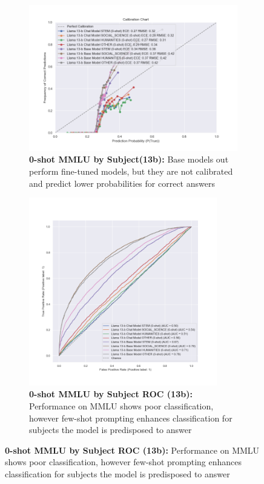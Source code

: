 \documentclass[11pt]{article}
\begin{document}
\begin{figure}
     \centering
     \begin{subfigure}[b]{0.60\textwidth}
         \centering \includegraphics[width=1.1\textwidth]{figures/0-shot-MMLU-subjects-13b.png}
         \caption{\textbf{0-shot MMLU by Subject(13b):}  Base models out perform fine-tuned models, but they are not calibrated and predict lower probabilities for correct answers}
         \label{fig:0-shot-MMLU}
     \end{subfigure}
     \hfill
     \begin{subfigure}[b]{0.38\textwidth}
         \centering \includegraphics[width=0.9\textwidth]{figures/0-shot-MMLU-subjects-13b-roc.png}
         \caption{\textbf{0-shot MMLU by Subject ROC (13b):} Performance on MMLU shows poor classification, however few-shot prompting enhances classification for subjects the model is predisposed to answer}
         \label{fig:0-shot-MMLU-ROC}
    \end{subfigure}
    

\end{figure}
\end{document}
